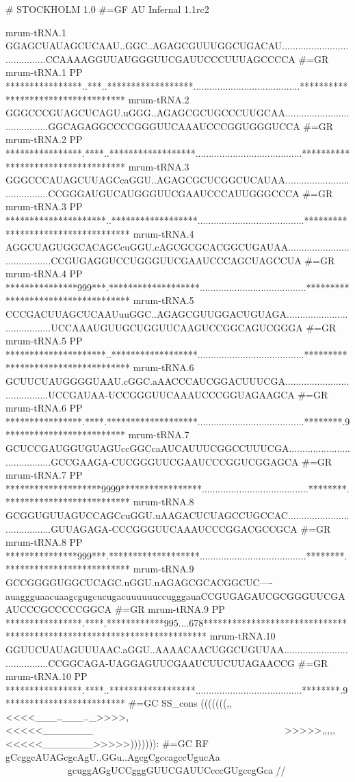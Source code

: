 \begin{tinysreoutput}
# STOCKHOLM 1.0
#=GF AU Infernal 1.1rc2

mrum-tRNA.1          GGAGCUAUAGCUCAAU..GGC..AGAGCGUUUGGCUGACAU........................................CCAAAAGGUUAUGGGUUCGAUUCCCUUUAGCCCCA
#=GR mrum-tRNA.1  PP ****************..***..******************........................................***********************************
mrum-tRNA.2          GGGCCCGUAGCUCAGU.uGGG..AGAGCGCUGCCCUUGCAA........................................GGCAGAGGCCCCGGGUUCAAAUCCCGGUGGGUCCA
#=GR mrum-tRNA.2  PP ****************.****..******************........................................***********************************
mrum-tRNA.3          GGGCCCAUAGCUUAGCcaGGU..AGAGCGCUCGGCUCAUAA........................................CCGGGAUGUCAUGGGUUCGAAUCCCAUUGGGCCCA
#=GR mrum-tRNA.3  PP *********************..******************........................................***********************************
mrum-tRNA.4          AGGCUAGUGGCACAGCcuGGU.cAGCGCGCACGGCUGAUAA........................................CCGUGAGGUCCUGGGUUCGAAUCCCAGCUAGCCUA
#=GR mrum-tRNA.4  PP ***************999***.*******************........................................***********************************
mrum-tRNA.5          CCCGACUUAGCUCAAUuuGGC..AGAGCGUUGGACUGUAGA........................................UCCAAAUGUUGCUGGUUCAAGUCCGGCAGUCGGGA
#=GR mrum-tRNA.5  PP *********************..******************........................................***********************************
mrum-tRNA.6          GCUUCUAUGGGGUAAU.cGGC.aAACCCAUCGGACUUUCGA........................................UCCGAUAA-UCCGGGUUCAAAUCCCGGUAGAAGCA
#=GR mrum-tRNA.6  PP ****************.****.*******************........................................********.9*************************
mrum-tRNA.7          GCUCCGAUGGUGUAGUccGGCcaAUCAUUUCGGCCUUUCGA........................................GCCGAAGA-CUCGGGUUCGAAUCCCGGUCGGAGCA
#=GR mrum-tRNA.7  PP ********************9999*****************........................................********.**************************
mrum-tRNA.8          GCGGUGUUAGUCCAGCcuGGU.uAAGACUCUAGCCUGCCAC........................................GUUAGAGA-CCCGGGUUCAAAUCCCGGACGCCGCA
#=GR mrum-tRNA.8  PP ***************999***.*******************........................................********.**************************
mrum-tRNA.9          GCCGGGGUGGCUCAGC.uGGU.uAGAGCGCACGGCUC----auaggguaacuaagcgugcucugacuuuuuuccugggauaCCGUGAGAUCGCGGGUUCGAAUCCCGCCCCCGGCA
#=GR mrum-tRNA.9  PP ****************.****.************995....678************************************************************************
mrum-tRNA.10         GGUUCUAUAGUUUAAC.aGGU..AAAACAACUGGCUGUUAA........................................CCGGCAGA-UAGGAGUUCGAAUCUUCUUAGAACCG
#=GR mrum-tRNA.10 PP ****************.****..******************........................................********.9*************************
#=GC SS_cons         (((((((,,<<<<___..___.._>>>>,<<<<<_______~~~~~~~~~~~~~~~~~~~~~~~~~~~~~~~~~~~~~~~~>>>>>,,,,,<<<<<_______>>>>>))))))):
#=GC RF              gCcggcAUAGcgcAgU..GGu..AgcgCgccagccUgucAa~~~~~~~~~~~~~~~~~~~~~~~~~~~~~~~~~~~~~~~~gcuggAGgUCCgggGUUCGAUUCcccGUgccgGca
//
\end{tinysreoutput}

